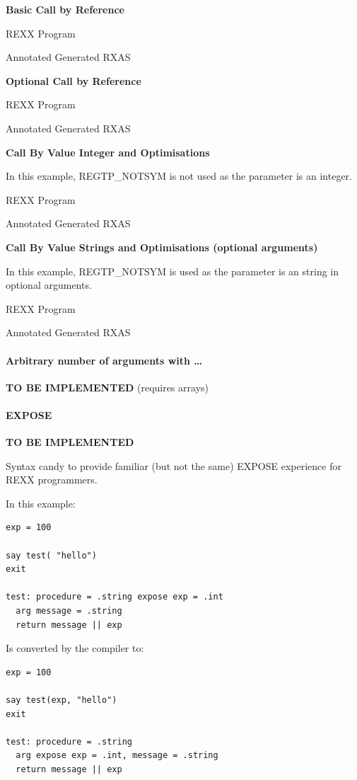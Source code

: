 \textbf{Basic Call by Reference}

REXX Program

Annotated Generated RXAS

\textbf{Optional Call by Reference}

REXX Program

Annotated Generated RXAS

\textbf{Call By Value Integer and Optimisations}

In this example, REGTP\_NOTSYM is not used as the parameter is an
integer.

REXX Program

Annotated Generated RXAS

\textbf{Call By Value Strings and Optimisations (optional arguments)}

In this example, REGTP\_NOTSYM is used as the parameter is an string in
optional arguments.

REXX Program

Annotated Generated RXAS

\hypertarget{arbitrary-number-of-arguments-with}{%
\paragraph{Arbitrary number of arguments with
\ldots{}}\label{arbitrary-number-of-arguments-with}}

\textbf{TO BE IMPLEMENTED} (requires arrays)

\hypertarget{expose}{%
\paragraph{EXPOSE}\label{expose}}

\textbf{TO BE IMPLEMENTED}

Syntax candy to provide familiar (but not the same) EXPOSE experience
for REXX programmers.

In this example:

\begin{verbatim}
exp = 100

say test( "hello")
exit

test: procedure = .string expose exp = .int
  arg message = .string
  return message || exp
\end{verbatim}

Is converted by the compiler to:

\begin{verbatim}
exp = 100

say test(exp, "hello")
exit

test: procedure = .string 
  arg expose exp = .int, message = .string
  return message || exp
\end{verbatim}

